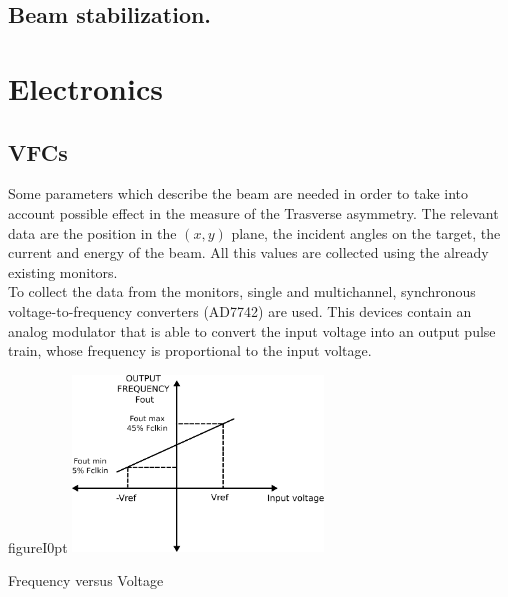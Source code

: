 \subsection{Beam stabilization.}

\section{Electronics}


\subsection{VFCs}

Some parameters which describe the beam are needed in order to take into account possible effect in the measure of the Trasverse asymmetry. The relevant data are the position in the $(x,y)$ plane, the incident angles on the target, the current and energy of the beam. All this values are collected using the already existing monitors. \\
To collect the data from the monitors, single and multichannel, synchronous voltage-to-frequency converters (AD7742) are used. This devices contain an analog modulator that is able to convert the input voltage into an output pulse train, whose frequency is proportional to the input voltage. 

\begin{wrapfloat}{figure}{I}{0pt}
\includegraphics[width=0.5\textwidth]{ExperimentalSetup/Vfc.pdf}
\caption{Frequency versus Voltage}
\end{wrapfloat}

